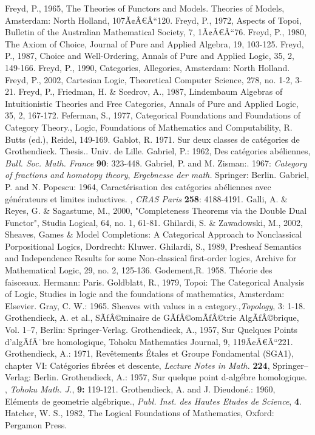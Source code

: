 \documentclass[12pt]{article}
\begin{document}
\begin{thebibliography}{199}
Freyd, P., 1965, The Theories of Functors and Models. Theories of Models, Amsterdam: North Holland, 107Ã¢Â€Â“120. 
Freyd, P., 1972, Aspects of Topoi, Bulletin of the Australian Mathematical Society, 7, 1Ã¢Â€Â“76.  
Freyd, P., 1980, The Axiom of Choice, Journal of Pure and Applied Algebra, 19, 103-125. 
Freyd, P., 1987, Choice and Well-Ordering, Annals of Pure and Applied Logic, 35, 2, 149-166.  
Freyd, P., 1990, Categories, Allegories, Amsterdam: North Holland. 
Freyd, P., 2002, Cartesian Logic, Theoretical Computer Science, 278, no. 1-2, 3-21.  
Freyd, P., Friedman, H. \& Scedrov, A., 1987, Lindembaum Algebras of Intuitionistic Theories and Free Categories, Annals of Pure and Applied Logic, 35, 2, 167-172.  
Feferman, S., 1977, Categorical Foundations and Foundations of Category Theory., Logic, Foundations of Mathematics and Computability, R. Butts (ed.), Reidel, 149-169.
Gablot, R. 1971. Sur deux classes de cat\'{e}gories de Grothendieck. Thesis..  Univ. de Lille.
Gabriel, P.: 1962, Des cat\'egories ab\'eliennes, \emph{Bull. Soc.
Math. France} \textbf{90}: 323-448.
Gabriel, P. and M. Zisman:. 1967: \emph{Category of fractions and homotopy theory}, \emph{Ergebnesse der math.} Springer: Berlin.
Gabriel, P. and N. Popescu: 1964, Caract\'{e}risation des cat\'egories ab\'eliennes
avec g\'{e}n\'{e}rateurs et limites inductives. , \emph{CRAS Paris} \textbf{258}: 4188-4191.
Galli, A. \& Reyes, G. \& Sagastume, M., 2000, "Completeness Theorems via the Double Dual Functor", Studia Logical, 64, no. 1, 61-81. 
Ghilardi, S. \& Zawadowski, M., 2002, Sheaves, Games \& Model Completions: A Categorical Approach to Nonclassical Porpositional Logics, Dordrecht: Kluwer.  
Ghilardi, S., 1989, Presheaf Semantics and Independence Results for some Non-classical first-order logics, Archive for Mathematical Logic, 29, no. 2, 125-136. 
Godement,R. 1958. Th\'{e}orie des faisceaux. Hermann: Paris.
Goldblatt, R., 1979, Topoi: The Categorical Analysis of Logic, Studies in logic and the foundations of mathematics, Amsterdam: Elsevier.
Gray, C. W.: 1965. Sheaves with values in a category.,\emph {Topology}, 3: 1-18.  
Grothendieck, A. et al., SÃƒÂ©minaire de GÃƒÂ©omÃƒÂ©trie AlgÃƒÂ©brique, Vol. 1--7, Berlin: Springer-Verlag.
Grothendieck, A., 1957, Sur Quelques Points d'algÃƒÂ¨bre homologique, Tohoku Mathematics Journal, 9, 119Ã¢Â€Â“221.  
Grothendieck, A.: 1971, Rev\^{e}tements \'Etales et Groupe Fondamental (SGA1),
chapter VI: Cat\'egories fibr\'ees et descente, \emph{Lecture Notes in Math.}
\textbf{224}, Springer--Verlag: Berlin.
Grothendieck, A.: 1957, Sur quelque point d-alg\'{e}bre homologique. , \emph{Tohoku Math. J.}, \textbf{9:} 119-121.
Grothendieck, A. and J. Dieudon\'{e}.: 1960, El\'{e}ments de geometrie alg\'{e}brique., \emph{Publ. Inst. des Hautes Etudes de Science}, \textbf{4}.
Hatcher, W. S., 1982, The Logical Foundations of Mathematics, Oxford: Pergamon Press. 


\end{thebibliography}
\end{document}
